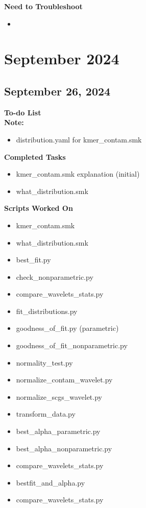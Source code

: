 \documentclass[11pt]{report}
\newcommand{\done}{\checkmark}
\newcommand{\draft}{\faPencil}
\begin{document}
{\begin{multicols}{2}
	\textbf{Need to Troubleshoot}
	\begin{itemize}
		\item 
	\end{itemize}
\end{multicols}

\newpage

	
\chapter{September 2024}
\begin{multicols}{2}
\section{September 26, 2024}


\textbf{To-do List} \\
\textbf{Note:} 

\begin{itemize}
	\item [\done] distribution.yaml for kmer\_contam.smk
	
	
\end{itemize}

\textbf{Completed Tasks}
\begin{itemize}
	\item [\done] kmer\_contam.smk explanation (initial)
	\item [\draft] what\_distribution.smk
	
\end{itemize}

\textbf{Scripts Worked On}
\begin{itemize}
	\item kmer\_contam.smk
	\item what\_distribution.smk
	\item best\_fit.py
	\item check\_nonparametric.py
	\item compare\_wavelets\_stats.py
	\item fit\_distributions.py
	\item goodness\_of\_fit.py (parametric)
	\item goodness\_of\_fit\_nonparametric.py
	\item normality\_test.py
	\item normalize\_contam\_wavelet.py
	\item normalize\_scgs\_wavelet.py
	\item transform\_data.py
	\item best\_alpha\_parametric.py
	\item best\_alpha\_nonparametric.py
	\item compare\_wavelets\_stats.py
	\item bestfit\_and\_alpha.py
	\item compare\_wavelets\_stats.py
	

\end{itemize}
\end{multicols}}
\end{document}
